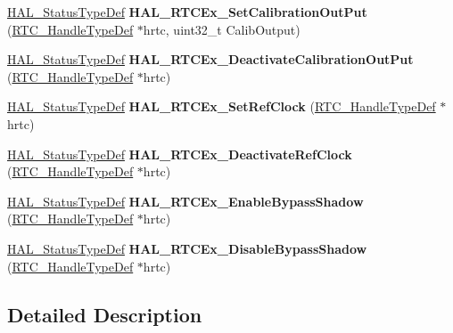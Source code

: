\begin{DoxyCompactItemize}
\item 
\mbox{\label{group___r_t_c_ex___exported___functions___group3_gafee5f33f43d10ae0b64aa073412de17e}} 
\hyperlink{stm32f0xx__hal__def_8h_a63c0679d1cb8b8c684fbb0632743478f}{H\+A\+L\+\_\+\+Status\+Type\+Def} {\bfseries H\+A\+L\+\_\+\+R\+T\+C\+Ex\+\_\+\+Set\+Calibration\+Out\+Put} (\hyperlink{struct_r_t_c___handle_type_def}{R\+T\+C\+\_\+\+Handle\+Type\+Def} $\ast$hrtc, uint32\+\_\+t Calib\+Output)
\item 
\mbox{\label{group___r_t_c_ex___exported___functions___group3_ga4cba173360f2993cafdd2c77fc51b7a9}} 
\hyperlink{stm32f0xx__hal__def_8h_a63c0679d1cb8b8c684fbb0632743478f}{H\+A\+L\+\_\+\+Status\+Type\+Def} {\bfseries H\+A\+L\+\_\+\+R\+T\+C\+Ex\+\_\+\+Deactivate\+Calibration\+Out\+Put} (\hyperlink{struct_r_t_c___handle_type_def}{R\+T\+C\+\_\+\+Handle\+Type\+Def} $\ast$hrtc)
\item 
\mbox{\label{group___r_t_c_ex___exported___functions___group3_gad3759b90bbf48597b2797411c72632dc}} 
\hyperlink{stm32f0xx__hal__def_8h_a63c0679d1cb8b8c684fbb0632743478f}{H\+A\+L\+\_\+\+Status\+Type\+Def} {\bfseries H\+A\+L\+\_\+\+R\+T\+C\+Ex\+\_\+\+Set\+Ref\+Clock} (\hyperlink{struct_r_t_c___handle_type_def}{R\+T\+C\+\_\+\+Handle\+Type\+Def} $\ast$hrtc)
\item 
\mbox{\label{group___r_t_c_ex___exported___functions___group3_ga86ca6b8e7b4ea0fede8e1aceef36fdbe}} 
\hyperlink{stm32f0xx__hal__def_8h_a63c0679d1cb8b8c684fbb0632743478f}{H\+A\+L\+\_\+\+Status\+Type\+Def} {\bfseries H\+A\+L\+\_\+\+R\+T\+C\+Ex\+\_\+\+Deactivate\+Ref\+Clock} (\hyperlink{struct_r_t_c___handle_type_def}{R\+T\+C\+\_\+\+Handle\+Type\+Def} $\ast$hrtc)
\item 
\mbox{\label{group___r_t_c_ex___exported___functions___group3_ga77d4058fefb7d89481ca1af3b87a8a32}} 
\hyperlink{stm32f0xx__hal__def_8h_a63c0679d1cb8b8c684fbb0632743478f}{H\+A\+L\+\_\+\+Status\+Type\+Def} {\bfseries H\+A\+L\+\_\+\+R\+T\+C\+Ex\+\_\+\+Enable\+Bypass\+Shadow} (\hyperlink{struct_r_t_c___handle_type_def}{R\+T\+C\+\_\+\+Handle\+Type\+Def} $\ast$hrtc)
\item 
\mbox{\label{group___r_t_c_ex___exported___functions___group3_gaabaf6726dca239445ea362554e0f8ce2}} 
\hyperlink{stm32f0xx__hal__def_8h_a63c0679d1cb8b8c684fbb0632743478f}{H\+A\+L\+\_\+\+Status\+Type\+Def} {\bfseries H\+A\+L\+\_\+\+R\+T\+C\+Ex\+\_\+\+Disable\+Bypass\+Shadow} (\hyperlink{struct_r_t_c___handle_type_def}{R\+T\+C\+\_\+\+Handle\+Type\+Def} $\ast$hrtc)
\end{DoxyCompactItemize}


\subsection{Detailed Description}
